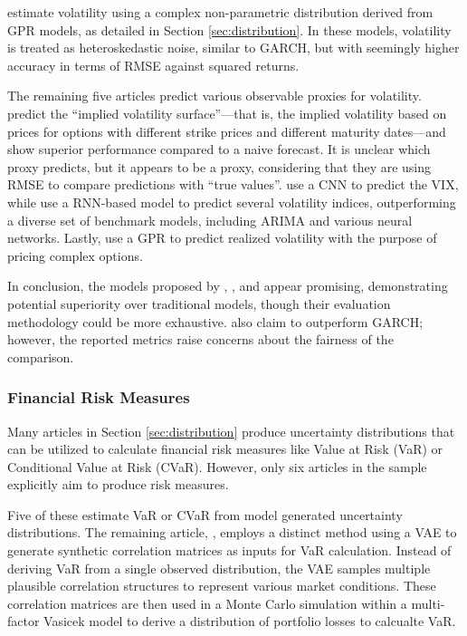 \textcite{Platanios2014gpr} estimate volatility using a complex non-parametric distribution derived from GPR models, as detailed in Section \ref{sec:distribution}. In these models, volatility is treated as heteroskedastic noise, similar to GARCH, but with seemingly higher accuracy in terms of RMSE against squared returns.

The remaining five articles predict various observable proxies for volatility. \textcite{tegner2021probabilistic} predict the ``implied volatility surface''—that is, the implied volatility based on prices for options with different strike prices and different maturity dates—and show superior performance compared to a naive forecast. It is unclear which proxy \textcite{jang2018empirical} predicts, but it appears to be a proxy, considering that they are using RMSE to compare predictions with ``true values''. \textcite{Daniali2021} use a CNN to predict the VIX, while \textcite{Tian2023} use a RNN-based model to predict several volatility indices, outperforming a diverse set of benchmark models, including ARIMA and various neural networks. Lastly, \textcite{Hocht2024gpr} use a GPR to predict realized volatility with the purpose of pricing complex options.

In conclusion, the models proposed by \textcite{tegner2021probabilistic}, \textcite{xing2019sentiment}, and \textcite{Platanios2014gpr} appear promising, demonstrating potential superiority over traditional models, though their evaluation methodology could be more exhaustive. \textcite{Parker2021BayesianHeteroskedastic} also claim to outperform GARCH; however, the reported metrics raise concerns about the fairness of the comparison.



\subsubsection{Financial Risk Measures}
\label{sec:financial_risk_measures}

Many articles in Section \ref{sec:distribution} produce uncertainty distributions that can be utilized to calculate financial risk measures like Value at Risk (VaR) or Conditional Value at Risk (CVaR). However, only six articles in the sample explicitly aim to produce risk measures.

Five of these estimate VaR or CVaR from model generated uncertainty distributions. The remaining article, \textcite{caprioli2023quantifying}, employs a distinct method using a VAE to generate synthetic correlation matrices as inputs for VaR calculation. Instead of deriving VaR from a single observed distribution, the VAE samples multiple plausible correlation structures to represent various market conditions. These correlation matrices are then used in a Monte Carlo simulation within a multi-factor Vasicek model to derive a distribution of portfolio losses to calcualte VaR.


